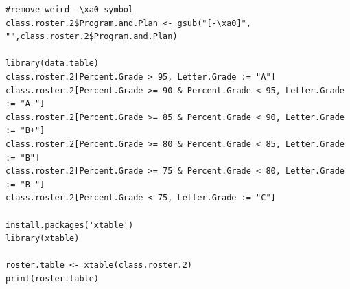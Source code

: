 \documentclass[letterpaper]{article}
\begin{document}
\begin{enumerate}
\begin{verbatim}
#remove weird -\xa0 symbol
class.roster.2$Program.and.Plan <- gsub("[-\xa0]", "",class.roster.2$Program.and.Plan)

library(data.table)
class.roster.2[Percent.Grade > 95, Letter.Grade := "A"]
class.roster.2[Percent.Grade >= 90 & Percent.Grade < 95, Letter.Grade := "A-"]
class.roster.2[Percent.Grade >= 85 & Percent.Grade < 90, Letter.Grade := "B+"]
class.roster.2[Percent.Grade >= 80 & Percent.Grade < 85, Letter.Grade := "B"]
class.roster.2[Percent.Grade >= 75 & Percent.Grade < 80, Letter.Grade := "B-"]
class.roster.2[Percent.Grade < 75, Letter.Grade := "C"]

install.packages('xtable')
library(xtable)

roster.table <- xtable(class.roster.2)
print(roster.table)

\end{verbatim}

\end{enumerate}
\end{document}
